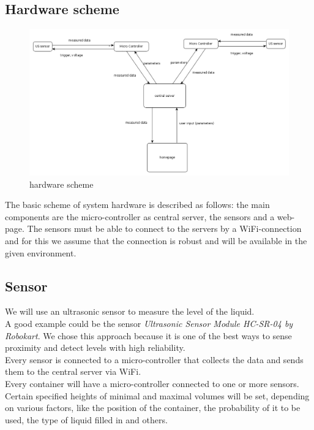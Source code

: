 \documentclass{article}
\begin{document}
\subsection{Hardware scheme}

\begin{figure}
\label{scheme}
\includegraphics[scale=4]{pic/circuit.png}
\caption{hardware scheme}
\end{figure}

The basic scheme of system hardware is described as follows: the main components
are the micro-controller as central server, the sensors and a web-page. The
sensors must be able to connect to the servers by a WiFi-connection and for this
we assume that the connection is robust and will be available in the given
environment.  \par
\FloatBarrier
\subsection{Sensor}
We will use an ultrasonic sensor to measure the level of the liquid. \\
A good example could be the sensor \textit{Ultrasonic Sensor Module HC-SR-04 by
  Robokart}. We chose this approach because it is one of the best ways to sense
proximity and detect levels with high reliability. \\ 

Every sensor is connected to a micro-controller that collects the data and sends
them to the central server via WiFi. \\ 

Every container will have a micro-controller connected to one or more sensors.
Certain specified heights of minimal and maximal volumes will be set, depending
on various factors, like the position of the container, the probability of it to
be used, the type of liquid filled in and others.
\end{document}
